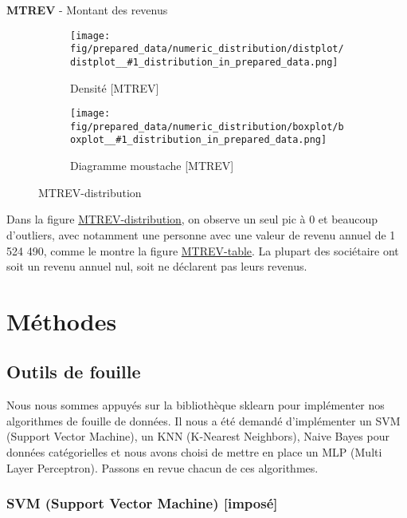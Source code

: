 \documentclass{ceri/sty/rapport}
\newcommand{\figureDistribution}[1]{
\begin{figure}[H]
    \centering
    \begin{subfigure}[t]{0.49\textwidth}
        \texttt{[image: fig/prepared\_data/numeric\_distribution/distplot/distplot\_\_\#1\_distribution\_in\_prepared\_data.png]}
        \caption{Densité [#1]}
        \label{fig:#1-density}
    \end{subfigure}
    \hfill
    \begin{subfigure}[t]{0.49\textwidth}
        \texttt{[image: fig/prepared\_data/numeric\_distribution/boxplot/boxplot\_\_\#1\_distribution\_in\_prepared\_data.png]}
        \caption{Diagramme moustache [#1]}
        \label{fig:#1-boxplot}
    \end{subfigure}
    \label{fig:#1-distribution}
    \caption{#1-distribution}
\end{figure}
}
\newcommand{\inputDescription}[1]{
\begin{table}[htb!]
	\centering
	\rowcolors{1}{fgVeryLightRed}{}
	
	\label{tab:#1-table}
    \caption{#1-table}
\end{table}
}
\begin{document}
\textbf{MTREV} - Montant des revenus
\figureDistribution{MTREV}
\inputDescription{MTREV}
Dans la figure \hyperref[fig:MTREV-distribution]{MTREV-distribution}, on observe un seul pic à 0 et beaucoup d'outliers, avec notamment une personne avec une valeur de revenu annuel de 1 524 490, comme le montre la figure \hyperref[tab:MTREV-table]{MTREV-table}. La plupart des sociétaire ont soit un revenu annuel nul, soit ne déclarent pas leurs revenus.







\section{Méthodes}

\subsection{Outils de fouille}


Nous nous sommes appuyés sur la bibliothèque sklearn pour implémenter nos algorithmes de fouille de données. Il nous a été demandé d'implémenter un SVM (Support Vector Machine), un KNN (K-Nearest Neighbors), Naive Bayes pour données catégorielles et nous avons choisi de mettre en place un MLP (Multi Layer Perceptron).
Passons en revue chacun de ces algorithmes.

\subsubsection{SVM (Support Vector Machine) [imposé]}
\end{document}
